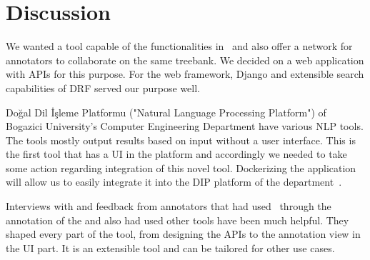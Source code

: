 \section{Discussion}
\label{sec:discussion}

We wanted a tool capable of the functionalities in \boatvone\ and also offer a network for annotators to collaborate on the same treebank.
We decided on a web application with APIs for this purpose.
For the web framework, Django and extensible search capabilities of DRF served our purpose well.

Doğal Dil İşleme Platformu ("Natural Language Processing Platform") of Bogazici University's Computer Engineering Department have various NLP tools.
The tools mostly output results based on input without a user interface.
This is the first tool that has a UI in the platform and accordingly we needed to take some action regarding integration of this novel tool.
Dockerizing the application will allow us to easily integrate it into the DIP platform of the department~\cite{DIP}.

Interviews with and feedback from annotators that had used \boatvone\ through the annotation of the \bountreebank{} and also had used other tools have been much helpful.
They shaped every part of the tool, from designing the APIs to the annotation view in the UI part.
It is an extensible tool and can be tailored for other use cases.
